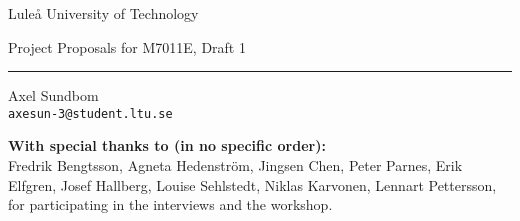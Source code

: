 \centering

{\Huge Luleå University of Technology}\par
\vspace{1ex}
{\Large Project Proposals for M7011E, Draft 1}\par
\rule{.5\textwidth}{.4pt}



\vspace{4ex}
\begin{minipage}{.3\textwidth}
\centering
Axel Sundbom\\
\texttt{axesun-3@student.ltu.se}
\end{minipage}

\vfill
\begin{abstract}
\noindent This document describes some programming project assignments for the course M7011E that came out of a fifth year project for computer engineering students. Most of these assignments are results of interviews with examiners and suggestions from a workshop that was heldas a part of the pre-study. You may redistribute this document under the terms and agreements of the MIT license.
\end{abstract}

\tableofcontents
\vfill
\textbf{With special thanks to (in no specific order):}\\
Fredrik Bengtsson, Agneta Hedenström, Jingsen Chen, Peter Parnes, Erik Elfgren, Josef Hallberg, Louise Sehlstedt, Niklas Karvonen, Lennart Pettersson, for participating in the interviews and the workshop.

